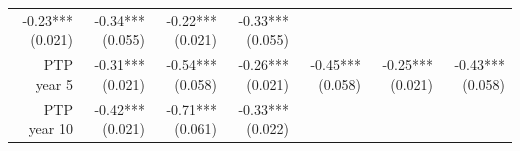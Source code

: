 \documentclass[]{article}
\begin{document}
\begin{longtable}[c]{@{}rrrrrrr@{}}
\begin{minipage}[t]{0.11\columnwidth}\raggedleft\strut
-0.23*** (0.021)
\strut\end{minipage} &
\begin{minipage}[t]{0.12\columnwidth}\raggedleft\strut
-0.34*** (0.055)
\strut\end{minipage} &
\begin{minipage}[t]{0.11\columnwidth}\raggedleft\strut
-0.22*** (0.021)
\strut\end{minipage} &
\begin{minipage}[t]{0.11\columnwidth}\raggedleft\strut
-0.33*** (0.055)
\strut\end{minipage}\tabularnewline
\begin{minipage}[t]{0.12\columnwidth}\raggedleft\strut
PTP year 5
\strut\end{minipage} &
\begin{minipage}[t]{0.11\columnwidth}\raggedleft\strut
-0.31*** (0.021)
\strut\end{minipage} &
\begin{minipage}[t]{0.12\columnwidth}\raggedleft\strut
-0.54*** (0.058)
\strut\end{minipage} &
\begin{minipage}[t]{0.11\columnwidth}\raggedleft\strut
-0.26*** (0.021)
\strut\end{minipage} &
\begin{minipage}[t]{0.12\columnwidth}\raggedleft\strut
-0.45*** (0.058)
\strut\end{minipage} &
\begin{minipage}[t]{0.11\columnwidth}\raggedleft\strut
-0.25*** (0.021)
\strut\end{minipage} &
\begin{minipage}[t]{0.11\columnwidth}\raggedleft\strut
-0.43*** (0.058)
\strut\end{minipage}\tabularnewline
\begin{minipage}[t]{0.12\columnwidth}\raggedleft\strut
PTP year 10
\strut\end{minipage} &
\begin{minipage}[t]{0.11\columnwidth}\raggedleft\strut
-0.42*** (0.021)
\strut\end{minipage} &
\begin{minipage}[t]{0.12\columnwidth}\raggedleft\strut
-0.71*** (0.061)
\strut\end{minipage} &
\begin{minipage}[t]{0.11\columnwidth}\raggedleft\strut
-0.33*** (0.022)
\strut\end{minipage} &

\end{longtable}
\end{document}
